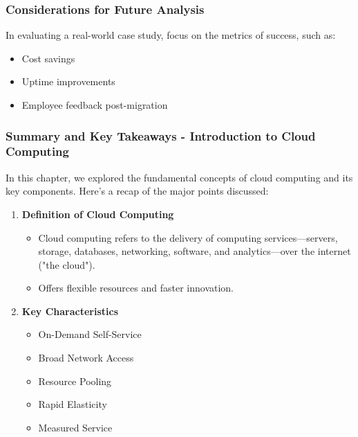 \documentclass[aspectratio=169]{beamer}
\begin{document}
\begin{frame}[fragile]
    \frametitle{Considerations for Future Analysis}
    In evaluating a real-world case study, focus on the metrics of success, such as:
    \begin{itemize}
        \item Cost savings
        \item Uptime improvements
        \item Employee feedback post-migration
    \end{itemize}
\end{frame}

\begin{frame}[fragile]
    \frametitle{Summary and Key Takeaways - Introduction to Cloud Computing}
    In this chapter, we explored the fundamental concepts of cloud computing and its key components. Here’s a recap of the major points discussed:
    \begin{enumerate}
        \item \textbf{Definition of Cloud Computing}
        \begin{itemize}
            \item Cloud computing refers to the delivery of computing services—servers, storage, databases, networking, software, and analytics—over the internet ("the cloud").
            \item Offers flexible resources and faster innovation.
        \end{itemize}
        
        \item \textbf{Key Characteristics}
        \begin{itemize}
            \item On-Demand Self-Service
            \item Broad Network Access
            \item Resource Pooling
            \item Rapid Elasticity
            \item Measured Service
        \end{itemize}
    \end{enumerate}
\end{frame}
\end{document}
